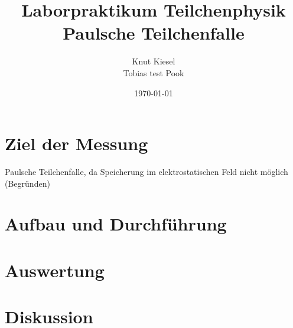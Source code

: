 \documentclass[a4paper,12pt]{article}
\title{Laborpraktikum Teilchenphysik\\ Paulsche Teilchenfalle}
\author{Knut Kiesel\\Tobias test Pook}
\date{\today}
\begin{document}
\maketitle
\thispagestyle{empty}
\newpage
\tableofcontents
\setcounter{page}{1}
\newpage

\section{Ziel der Messung} %
Paulsche Teilchenfalle, da Speicherung im elektrostatischen Feld nicht möglich (Begründen)


\section{Aufbau und Durchführung}


\section{Auswertung}
\section{Diskussion}

\begin{figure}[htb]
		\centering
		\label{fig:lhc}
\end{figure}
\FloatBarrier







\end{document}
